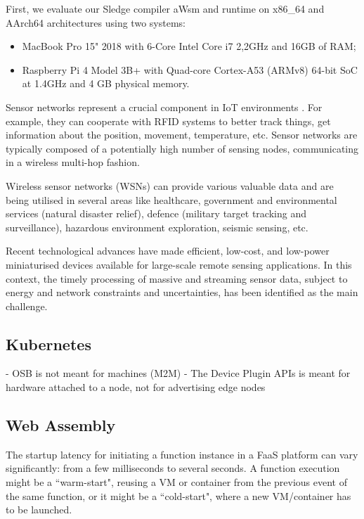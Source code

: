 \documentclass{ieeeaccess}
\begin{document}
First, we evaluate our Sledge compiler aWsm and runtime on x86\_64 and AArch64 architectures using two systems:

\begin{itemize}
    \item MacBook Pro 15" 2018 with 6-Core Intel Core i7 2,2GHz and 16GB of RAM;
    \item Raspberry Pi 4 Model 3B+ with Quad-core Cortex-A53 (ARMv8) 64-bit SoC at 1.4GHz and 4 GB physical memory.
\end{itemize}

Sensor networks represent a crucial component in IoT environments \cite{edge-computing-survey}. For example, they can cooperate with RFID systems to better track things, get information about the position, movement, temperature, etc. Sensor networks are typically composed of a potentially high number of sensing nodes, communicating in a wireless multi-hop fashion.

Wireless sensor networks (WSNs) can provide various valuable data and are being utilised in several areas like healthcare, government and environmental services (natural disaster relief), defence (military target tracking and surveillance), hazardous environment exploration, seismic sensing, etc.

Recent technological advances have made efficient, low-cost, and low-power miniaturised devices available for large-scale remote sensing applications. In this context, the timely processing of massive and streaming sensor data, subject to energy and network constraints and uncertainties, has been identified as the main challenge.

\subsection{Kubernetes}

- OSB is not meant for machines (M2M)
- The Device Plugin APIs is meant for hardware attached to a node, not for advertising edge nodes

\subsection{Web Assembly}

The startup latency for initiating a function instance in a FaaS platform can vary significantly: from a few milliseconds to several seconds. A function execution might be a “warm-start", reusing a VM or container from the previous event of the same function, or it might be a “cold-start", where a new VM/container has to be launched.
\end{document}
